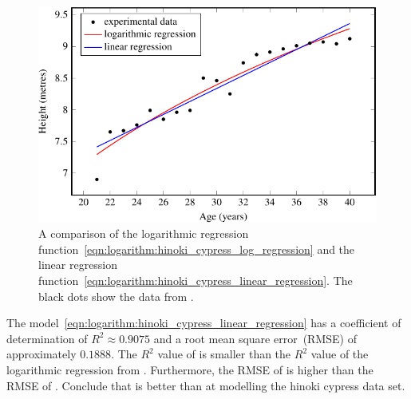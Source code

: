\documentclass[a4paper,oneside,12pt]{article}
\begin{document}
{\begin{solution}
\begin{figure}[!htbp]
\centering
\includegraphics[scale=1.1]{image/12/hinoki-cypress-linear-log.pdf}
\caption{%
  A comparison of the logarithmic regression
  function~\eqref{eqn:logarithm:hinoki_cypress_log_regression} and the
  linear regression
  function~\eqref{eqn:logarithm:hinoki_cypress_linear_regression}.
  The black dots show the data from
  .
}
\label{fig:logarithm:hinoki_cypress_regression_comparison}
\end{figure}

The model~\eqref{eqn:logarithm:hinoki_cypress_linear_regression} has a
coefficient of determination of $R^2 \approx 0.9075$ and a root mean
square error~(RMSE) of approximately $0.1888$.  The $R^2$ value of
 is smaller
than the $R^2$ value of the logarithmic regression from
.  Furthermore, the RMSE of
 is higher
than the RMSE of
.  Conclude that
 is better than
 at modelling
the hinoki cypress data set.
\end{solution}
}{}

\begin{table}[!htbp]
\centering

\caption{%
  The mean diameter at breast height~(DBH) versus mean height of $35$
  species of trees in a selective logging forest.  The study site was
  called Sombo and the forest was located in the northern region of
  the Republic of Congo, Africa.  The DBH of a tree is usually
  measured at $1.3$ metres above ground level.  DBH is measured in
  centimetres and tree height is measured in metres.
}
\label{tab:logarithm:Sombo}
\end{table}
\end{document}
